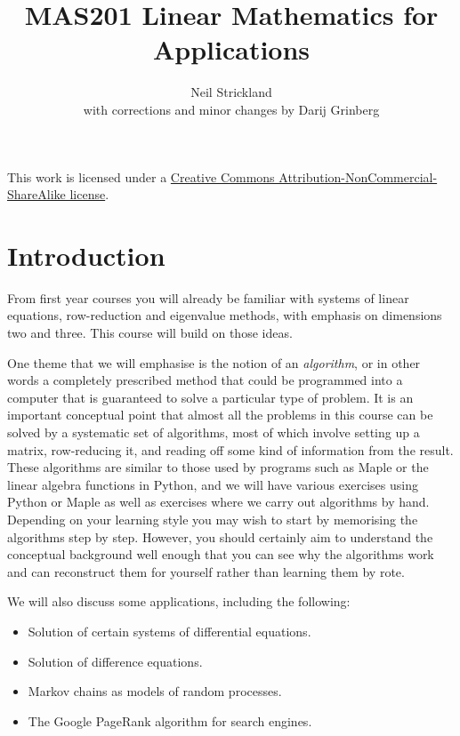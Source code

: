 \documentclass[reqno]{amsart}
\theoremstyle{definition}
\begin{document}
\title{MAS201 Linear Mathematics for Applications}
\author{Neil Strickland \\ with corrections and minor changes by Darij Grinberg}

\maketitle

\begin{center}
 This work is licensed under a 
 \href{https://creativecommons.org/licenses/by-nc-sa/3.0/deed.en}{%
  Creative Commons Attribution-NonCommercial-ShareAlike license}.
 
 \bigskip

 \doclicenseImage 
\end{center}

\tableofcontents 

\section{Introduction}
\label{sec-intro}

From first year courses you will already be familiar with systems of
linear equations, row-reduction and eigenvalue methods, with emphasis
on dimensions two and three.  This course will build on those ideas.  

One theme that we will emphasise is the notion of an \emph{algorithm},
or in other words a completely prescribed method that could be
programmed into a computer that is guaranteed to solve a particular
type of problem.  It is an important conceptual point that almost all
the problems in this course can be solved by a systematic set of
algorithms, most of which involve setting up a matrix, row-reducing
it, and reading off some kind of information from the result.  These
algorithms are similar to those used by programs such as Maple or the
linear algebra functions in Python, and we will have various exercises
using Python or Maple as well as exercises where we carry out
algorithms by hand.  Depending on your learning style you may wish to
start by memorising the algorithms step by step.  However, you should
certainly aim to understand the conceptual background well enough that
you can see why the algorithms work and can reconstruct them for
yourself rather than learning them by rote.

We will also discuss some applications, including the following:
\begin{itemize}
 \item Solution of certain systems of differential equations.
 \item Solution of difference equations.
 \item Markov chains as models of random processes.
 \item The Google PageRank algorithm for search engines.
\end{itemize}
\end{document}
